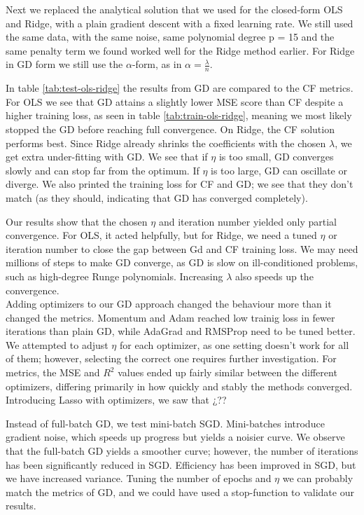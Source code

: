 \documentclass[amssymb,twocolumn,aps]{revtex4-2}
\begin{document}
Next we replaced the analytical solution that we used for the closed-form OLS and Ridge, with a plain gradient descent with a fixed learning rate. We still used the same data, with the same noise, same polynomial degree p = 15 and the same penalty term we found worked well for the Ridge method earlier. For Ridge in GD form we still use the $\alpha$-form, as in $\alpha=\frac{\lambda}{n}$. 

In table \ref{tab:test-ols-ridge} the results from GD are compared to the CF metrics. For OLS we see that GD attains a slightly lower MSE score than CF despite a higher training loss, as seen in table \ref{tab:train-ols-ridge}, meaning we most likely stopped the GD before reaching full convergence. On Ridge, the CF solution performs best. Since Ridge already shrinks the coefficients with the chosen $\lambda$, we get extra under-fitting with GD. We see that if $\eta$ is too small, GD converges slowly and can stop far from the optimum. If $\eta$ is too large, GD can oscillate or diverge. We also printed the training loss for CF and GD; we see that they don't match (as they should, indicating that GD has converged completely).

Our results show that the chosen $\eta$ and iteration number yielded only partial convergence. For OLS, it acted helpfully, but for Ridge, we need a tuned $\eta$ or iteration number to close the gap between Gd and CF training loss. We may need millions of steps to make GD converge, as GD is slow on ill-conditioned problems, such as high-degree Runge polynomials. Increasing $\lambda$ also speeds up the convergence. \\

Adding optimizers to our GD approach changed the behaviour more than it changed the metrics. Momentum and Adam reached low trainig loss in fewer iterations than plain GD, while AdaGrad and RMSProp need to be tuned better. We attempted to adjust $\eta$ for each optimizer, as one setting doesn't work for all of them; however, selecting the correct one requires further investigation. For metrics, the MSE and $R^2$ values ended up fairly similar between the different optimizers, differing primarily in how quickly and stably the methods converged. \\

Introducing Lasso with optimizers, we saw that ¿??

Instead of full-batch GD, we test mini-batch SGD. Mini-batches introduce gradient noise, which speeds up progress but yields a noisier curve. We observe that the full-batch GD yields a smoother curve; however, the number of iterations has been significantly reduced in SGD. Efficiency has been improved in SGD, but we have increased variance. Tuning the number of epochs and $\eta$ we can probably match the metrics of GD, and we could have used a stop-function to validate our results. \\
\end{document}
